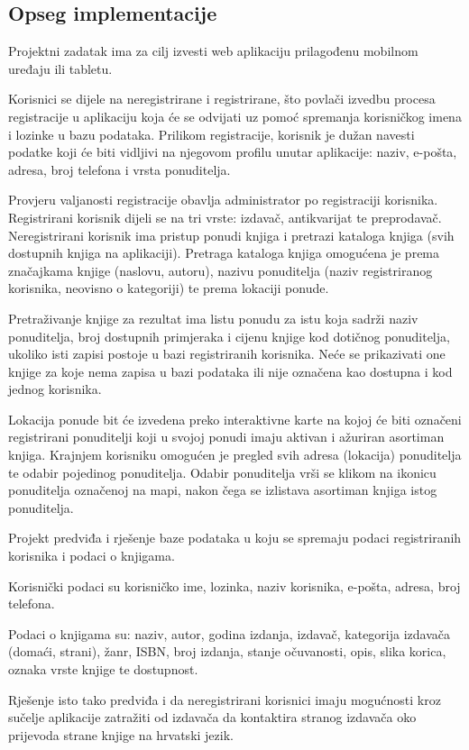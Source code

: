 		\subsection*{Opseg implementacije}
		
		Projektni zadatak ima za cilj izvesti web aplikaciju prilagođenu mobilnom uređaju ili tabletu.
		
		Korisnici se dijele na neregistrirane i registrirane, što povlači izvedbu procesa registracije u aplikaciju koja će se odvijati uz pomoć spremanja korisničkog imena i lozinke u bazu podataka. Prilikom registracije, korisnik je dužan navesti podatke koji će biti vidljivi na njegovom profilu unutar aplikacije: naziv, e-pošta, adresa, broj telefona i vrsta ponuditelja.
		
		Provjeru valjanosti registracije obavlja administrator po registraciji korisnika.
		Registrirani korisnik dijeli se na tri vrste: izdavač, antikvarijat te preprodavač.
		Neregistrirani korisnik ima pristup ponudi knjiga i  pretrazi kataloga knjiga (svih dostupnih knjiga na aplikaciji). Pretraga kataloga knjiga omogućena je prema značajkama knjige (naslovu, autoru), nazivu ponuditelja (naziv registriranog korisnika, neovisno o kategoriji) te prema lokaciji ponude. 
		
		Pretraživanje knjige za rezultat ima listu ponudu za istu koja sadrži naziv ponuditelja, broj dostupnih	primjeraka i cijenu knjige kod dotičnog ponuditelja, ukoliko isti zapisi postoje u bazi registriranih korisnika. Neće se prikazivati one knjige  za koje nema zapisa u bazi podataka  ili nije označena kao dostupna i kod jednog  korisnika.
		
		Lokacija ponude bit će izvedena preko interaktivne karte na kojoj će biti označeni registrirani ponuditelji koji u svojoj ponudi imaju aktivan i ažuriran asortiman knjiga. Krajnjem korisniku omogućen je pregled svih adresa  (lokacija) ponuditelja te odabir pojedinog ponuditelja. Odabir ponuditelja vrši se klikom na ikonicu ponuditelja označenoj na mapi, nakon čega se izlistava asortiman knjiga istog ponuditelja.
		
		Projekt predviđa i rješenje baze podataka u koju se spremaju podaci registriranih korisnika i podaci o knjigama.
		
		Korisnički podaci su korisničko ime, lozinka, naziv korisnika,  e-pošta, adresa, broj telefona.
		
		Podaci o knjigama su: naziv, autor, godina izdanja, izdavač, kategorija izdavača (domaći, strani), žanr, ISBN, broj izdanja, stanje očuvanosti, opis, slika korica, oznaka vrste knjige te dostupnost.
		
		Rješenje isto tako predviđa i da neregistrirani korisnici imaju mogućnosti  kroz sučelje aplikacije zatražiti od izdavača da kontaktira stranog izdavača oko prijevoda strane knjige na hrvatski jezik. 
		